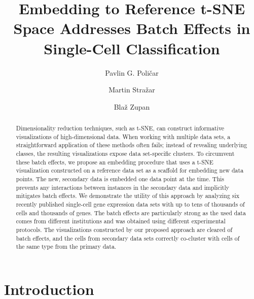 \documentclass[runningheads]{llncs}
\begin{document}
%
\title{Embedding to Reference t-SNE Space Addresses Batch Effects in Single-Cell Classification}
%
%
\author{Pavlin G. Poli\v{c}ar \and
Martin Stra\v{z}ar \and
Bla\v{z} Zupan}
%
%

\maketitle

\begin{abstract}

Dimensionality reduction techniques, such as t-SNE, can construct informative
visualizations of high-dimensional data. When working with multiple data
sets, a straightforward application of these methods often fails; instead of
revealing underlying classes, the resulting visualizations expose data
set-specific clusters. To circumvent these batch effects, we propose an
embedding procedure that uses a t-SNE visualization constructed on a
reference data set as a scaffold for embedding new data points. The new,
secondary data is embedded one data point at the time. This prevents any
interactions between instances in the secondary data and implicitly mitigates
batch effects. We demonstrate the utility of this approach by analyzing six
recently published single-cell gene expression data sets with up to tens of
thousands of cells and thousands of genes. The batch effects are particularly
strong as the used data comes from different institutions and was obtained
using different experimental protocols. The visualizations constructed by our
proposed approach are cleared of batch effects, and the cells from secondary
data sets correctly co-cluster with cells of the same type from the primary
data.

\end{abstract}


\section{Introduction}
\label{sec:intro}
\end{document}
